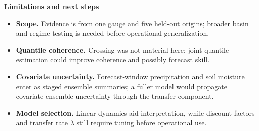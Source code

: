 \documentclass[final]{beamer}
\newlength{\PosterSharedColumnWidth}
\newcommand{\SmallBodyFont}{\fontsize{24}{30}\selectfont}
\newcommand{\SourceCaptionFont}{\fontsize{20.5}{24.2}\selectfont}
\newcommand{\PosterFooter}{}
\begin{document}
\begin{frame}[t]
{\begin{minipage}[t]{\PosterSharedColumnWidth}
\begin{minipage}[t]{\linewidth}
\vspace{0.20cm}
\begin{LimitBox}
  {\SmallBodyFont\bfseries\color{LimitColor}Limitations and next steps\par}
  \vspace{0.02cm}
  {\SourceCaptionFont\color{PosterInk}
  \begin{itemize}
    \setlength{\itemsep}{0.02cm}
    \setlength{\parskip}{0pt}
    \setlength{\parsep}{0pt}
    \item \textbf{\color{LimitColor}Scope.} Evidence is from one gauge and
    five held-out origins; broader basin and regime testing is needed before
    operational generalization.
    \item \textbf{\color{LimitColor}Quantile coherence.} Crossing was not
    material here; joint quantile estimation could improve coherence and
    possibly forecast skill.
    \item \textbf{\color{LimitColor}Covariate uncertainty.} Forecast-window
    precipitation and soil moisture enter as staged ensemble summaries; a fuller
    model would propagate covariate-ensemble uncertainty through the transfer
    component.
    \item \textbf{\color{LimitColor}Model selection.} Linear dynamics aid
    interpretation, while discount factors and transfer rate \(\lambda\) still
    require tuning before operational use.
  \end{itemize}\par}
\end{LimitBox}

\end{minipage}
\end{minipage}
\vspace*{-2.05cm}
}

\PosterFooter

\end{frame}
\end{document}
